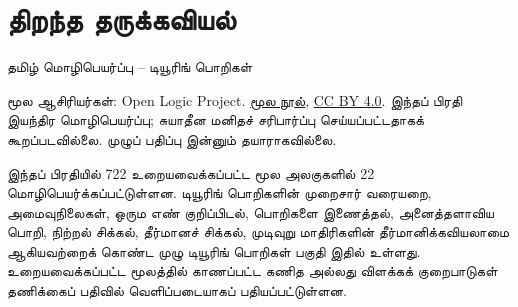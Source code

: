 \documentclass[11pt,a4paper,openany]{memoir}
\begin{document}
\raggedright
\raggedbottom
\pagestyle{plain}
\chapter*{திறந்த தருக்கவியல்}
\noindent தமிழ் மொழிபெயர்ப்பு -- டியூரிங் பொறிகள்

\noindent மூல ஆசிரியர்கள்: Open Logic Project.
\href{https://github.com/OpenLogicProject/OpenLogic}{மூல நூல்},
\href{https://creativecommons.org/licenses/by/4.0/}{CC BY 4.0}.
இந்தப் பிரதி இயந்திர மொழிபெயர்ப்பு; சுயாதீன மனிதச் சரிபார்ப்பு செய்யப்பட்டதாகக்
கூறப்படவில்லை. முழுப் பதிப்பு இன்னும் தயாராகவில்லை.

\noindent இந்தப் பிரதியில் 722 உறையவைக்கப்பட்ட மூல அலகுகளில் 22
மொழிபெயர்க்கப்பட்டுள்ளன. டியூரிங் பொறிகளின் முறைசார் வரையறை,
அமைவுநிலைகள், ஒரும எண் குறிப்பிடல், பொறிகளை இணைத்தல், அனைத்தளாவிய
பொறி, நிற்றல் சிக்கல், தீர்மானச் சிக்கல், முடிவுறு மாதிரிகளின்
தீர்மானிக்கவியலாமை ஆகியவற்றைக் கொண்ட முழு டியூரிங் பொறிகள் பகுதி
இதில் உள்ளது. உறையவைக்கப்பட்ட மூலத்தில் காணப்பட்ட கணித அல்லது
விளக்கக் குறைபாடுகள் தணிக்கைப் பதிவில் வெளிப்படையாகப் பதியப்பட்டுள்ளன.

\clearpage
\tableofcontents*

\end{document}
